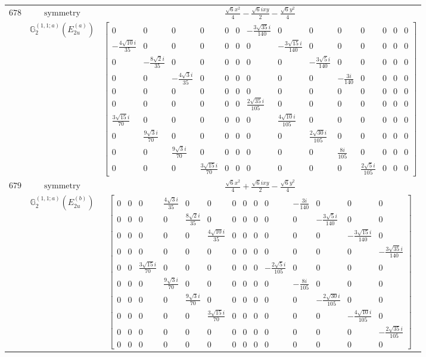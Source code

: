 \documentclass[fleqn,8pt,landscape]{jsarticle}
\begin{document}
\begin{longtable}{ccc}
$ 678 $ & $ \text{symmetry} $ & $ \frac{\sqrt{6} x^{2}}{4} - \frac{\sqrt{6} i x y}{2} - \frac{\sqrt{6} y^{2}}{4} $ \\
$  $ & $ \mathbb{G}_{2}^{(1,1;a)}(E_{2u}^{(a)}) $ & $ \begin{bmatrix} 0 & 0 & 0 & 0 & 0 & 0 & - \frac{3 \sqrt{35} i}{140} & 0 & 0 & 0 & 0 & 0 & 0 & 0 \\ - \frac{4 \sqrt{10} i}{35} & 0 & 0 & 0 & 0 & 0 & 0 & - \frac{3 \sqrt{15} i}{140} & 0 & 0 & 0 & 0 & 0 & 0 \\ 0 & - \frac{8 \sqrt{2} i}{35} & 0 & 0 & 0 & 0 & 0 & 0 & - \frac{3 \sqrt{5} i}{140} & 0 & 0 & 0 & 0 & 0 \\ 0 & 0 & - \frac{4 \sqrt{3} i}{35} & 0 & 0 & 0 & 0 & 0 & 0 & - \frac{3 i}{140} & 0 & 0 & 0 & 0 \\ 0 & 0 & 0 & 0 & 0 & 0 & 0 & 0 & 0 & 0 & 0 & 0 & 0 & 0 \\ 0 & 0 & 0 & 0 & 0 & 0 & \frac{2 \sqrt{35} i}{105} & 0 & 0 & 0 & 0 & 0 & 0 & 0 \\ \frac{3 \sqrt{15} i}{70} & 0 & 0 & 0 & 0 & 0 & 0 & \frac{4 \sqrt{10} i}{105} & 0 & 0 & 0 & 0 & 0 & 0 \\ 0 & \frac{9 \sqrt{3} i}{70} & 0 & 0 & 0 & 0 & 0 & 0 & \frac{2 \sqrt{30} i}{105} & 0 & 0 & 0 & 0 & 0 \\ 0 & 0 & \frac{9 \sqrt{3} i}{70} & 0 & 0 & 0 & 0 & 0 & 0 & \frac{8 i}{105} & 0 & 0 & 0 & 0 \\ 0 & 0 & 0 & \frac{3 \sqrt{15} i}{70} & 0 & 0 & 0 & 0 & 0 & 0 & \frac{2 \sqrt{5} i}{105} & 0 & 0 & 0 \end{bmatrix} $ \\ \hline
$ 679 $ & $ \text{symmetry} $ & $ \frac{\sqrt{6} x^{2}}{4} + \frac{\sqrt{6} i x y}{2} - \frac{\sqrt{6} y^{2}}{4} $ \\
$  $ & $ \mathbb{G}_{2}^{(1,1;a)}(E_{2u}^{(b)}) $ & $ \begin{bmatrix} 0 & 0 & 0 & \frac{4 \sqrt{3} i}{35} & 0 & 0 & 0 & 0 & 0 & 0 & - \frac{3 i}{140} & 0 & 0 & 0 \\ 0 & 0 & 0 & 0 & \frac{8 \sqrt{2} i}{35} & 0 & 0 & 0 & 0 & 0 & 0 & - \frac{3 \sqrt{5} i}{140} & 0 & 0 \\ 0 & 0 & 0 & 0 & 0 & \frac{4 \sqrt{10} i}{35} & 0 & 0 & 0 & 0 & 0 & 0 & - \frac{3 \sqrt{15} i}{140} & 0 \\ 0 & 0 & 0 & 0 & 0 & 0 & 0 & 0 & 0 & 0 & 0 & 0 & 0 & - \frac{3 \sqrt{35} i}{140} \\ 0 & 0 & \frac{3 \sqrt{15} i}{70} & 0 & 0 & 0 & 0 & 0 & 0 & - \frac{2 \sqrt{5} i}{105} & 0 & 0 & 0 & 0 \\ 0 & 0 & 0 & \frac{9 \sqrt{3} i}{70} & 0 & 0 & 0 & 0 & 0 & 0 & - \frac{8 i}{105} & 0 & 0 & 0 \\ 0 & 0 & 0 & 0 & \frac{9 \sqrt{3} i}{70} & 0 & 0 & 0 & 0 & 0 & 0 & - \frac{2 \sqrt{30} i}{105} & 0 & 0 \\ 0 & 0 & 0 & 0 & 0 & \frac{3 \sqrt{15} i}{70} & 0 & 0 & 0 & 0 & 0 & 0 & - \frac{4 \sqrt{10} i}{105} & 0 \\ 0 & 0 & 0 & 0 & 0 & 0 & 0 & 0 & 0 & 0 & 0 & 0 & 0 & - \frac{2 \sqrt{35} i}{105} \\ 0 & 0 & 0 & 0 & 0 & 0 & 0 & 0 & 0 & 0 & 0 & 0 & 0 & 0 \end{bmatrix} $ \\ \hline

\end{longtable}
\end{document}
